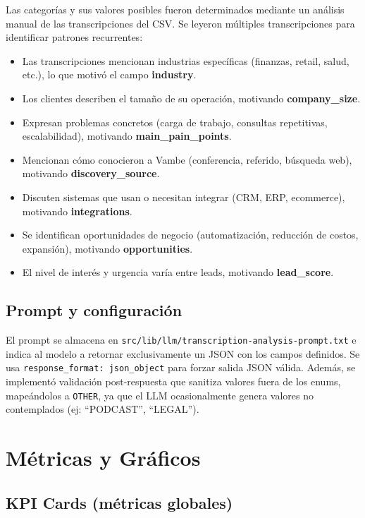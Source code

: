 \documentclass[11pt,a4paper]{article}
\begin{document}
Las categorías y sus valores posibles fueron determinados mediante un análisis manual de las transcripciones del CSV. Se leyeron múltiples transcripciones para identificar patrones recurrentes:

\begin{itemize}[noitemsep]
  \item Las transcripciones mencionan industrias específicas (finanzas, retail, salud, etc.), lo que motivó el campo \textbf{industry}.
  \item Los clientes describen el tamaño de su operación, motivando \textbf{company\_size}.
  \item Expresan problemas concretos (carga de trabajo, consultas repetitivas, escalabilidad), motivando \textbf{main\_pain\_points}.
  \item Mencionan cómo conocieron a Vambe (conferencia, referido, búsqueda web), motivando \textbf{discovery\_source}.
  \item Discuten sistemas que usan o necesitan integrar (CRM, ERP, ecommerce), motivando \textbf{integrations}.
  \item Se identifican oportunidades de negocio (automatización, reducción de costos, expansión), motivando \textbf{opportunities}.
  \item El nivel de interés y urgencia varía entre leads, motivando \textbf{lead\_score}.
\end{itemize}

\subsection{Prompt y configuración}

El prompt se almacena en \texttt{src/lib/llm/transcription-analysis-prompt.txt} e indica al modelo a retornar exclusivamente un JSON con los campos definidos. Se usa \texttt{response\_format: json\_object} para forzar salida JSON válida. Además, se implementó validación post-respuesta que sanitiza valores fuera de los enums, mapeándolos a \texttt{OTHER}, ya que el LLM ocasionalmente genera valores no contemplados (ej: ``PODCAST'', ``LEGAL'').

\section{Métricas y Gráficos}

\subsection{KPI Cards (métricas globales)}
\end{document}
